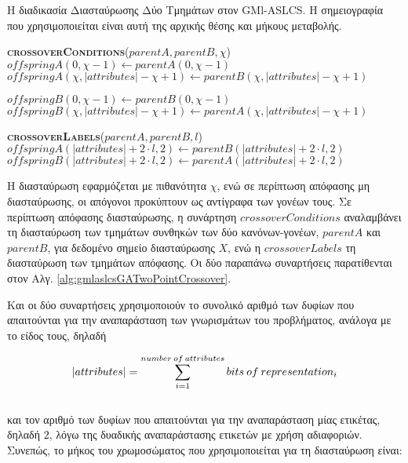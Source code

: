  
\begin{algorithm}[h!]
 \caption[Η διαδικασία Διασταύρωσης Δύο Τμημάτων στον GMl-ASLCS]{Η διαδικασία Διασταύρωσης Δύο Τμημάτων στον GMl-ASLCS. Η σημειογραφία που χρησιμοποιείται είναι αυτή της αρχικής θέσης και μήκους μεταβολής.} 
 \label{alg:gmlaslcsGATwoPointCrossover}
  \begin{algorithmic}[1]
  	\STATE \textbf{\textsc{crossoverConditions}}($parentA, parentB, \chi$)
  	  	\STATE $offspringA(0, \chi -1) \gets parentA(0, \chi -1)$
  		\STATE $offspringA(\chi,|attributes|-\chi+1) \gets parentB(\chi,|attributes|-\chi+1)$
  	
    	\STATE $offspringB(0, \chi -1) \gets parentB(0, \chi -1)$
  		\STATE $offspringB(\chi, |attributes| - \chi +1) \gets parentA(\chi, |attributes| - \chi +1)$
   \end{algorithmic}
   
   
  \hspace*{2em}
 
 
  \begin{algorithmic}[1]
  	\STATE \textbf{\textsc{crossoverLabels}}($parentA, parentB, l$)
  	  	\STATE $offspringA(|attributes|+ 2 \cdot l , 2) \gets parentB(|attributes|+ 2 \cdot l, 2)$
  	  	\STATE $offspringB(|attributes|+ 2 \cdot l, 2) \gets parentA(|attributes|+ 2 \cdot l, 2)$
   \end{algorithmic}
\end{algorithm}      
   
   
   
Η διασταύρωση εφαρμόζεται με πιθανότητα $\chi$, ενώ σε περίπτωση απόφασης μη διασταύρωσης, οι απόγονοι προκύπτουν ως αντίγραφα των γονέων τους. Σε περίπτωση απόφασης διασταύρωσης, η συνάρτηση $crossoverConditions$ αναλαμβάνει τη διασταύρωση των τμημάτων συνθηκών των δύο κανόνων-γονέων, $parentA$ και $parentB$, για δεδομένο σημείο διασταύρωσης $X$, ενώ η $crossoverLabels$ τη διασταύρωση των τμημάτων απόφασης. Οι δύο παραπάνω συναρτήσεις παρατίθενται στον Αλγ. \ref{alg:gmlaslcsGATwoPointCrossover}. 

Και οι δύο συναρτήσεις χρησιμοποιούν το συνολικό αριθμό των δυφίων που απαιτούνται για την αναπαράσταση των γνωρισμάτων του προβλήματος, ανάλογα με το είδος τους, δηλαδή 

\begin{equation}
\lvert attributes\rvert = \sum_{i=1}^{number \: of \: attributes} bits \: of \: representation_{i}
\end{equation}
\\
και τον αριθμό των δυφίων που απαιτούνται για την αναπαράσταση μίας ετικέτας, δηλαδή $2$, λόγω της δυαδικής αναπαράστασης ετικετών με χρήση αδιαφοριών. Συνεπώς, το μήκος του χρωμοσώματος που χρησιμοποιείται για τη διασταύρωση είναι:

